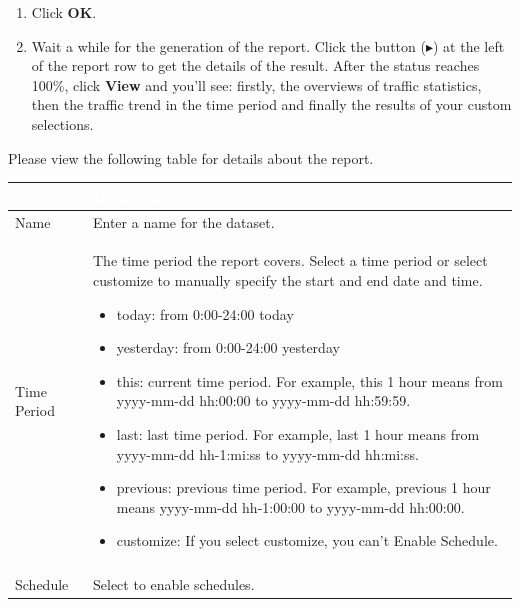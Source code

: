 \begin{description}
\begin{enumerate}
        \item Click \textbf{OK}.
        \item Wait a while for the generation of the report. Click the button (\mbox{$\blacktriangleright$}) at the left of the report row to get the details of the result. 
        After the status reaches 100\%, click \textbf{View} and you’ll see: firstly, the overviews of traffic statistics, then the traffic trend in the time period and finally the results of your custom selections. 
    \end{enumerate}
    \item[] Please view the following table for details about the report.
    \begin{longtable}{p{}|p{}}   
        \rowcolor{black}\multicolumn{1}{l!\vlinewhite}{\textcolor{white}{Field}}  & \textcolor{white}{Description} \\\hline                                                                                                                                                          
        Name & Enter a name for the dataset.\\\hline  
        Time Period & The time period the report covers. Select a time period or select customize to manually specify the start and end date and time.
                        \begin{itemize}
                            \item today: from 0:00-24:00 today
                            \item yesterday: from 0:00-24:00 yesterday
                            \item this: current time period. For example, this 1 hour means from yyyy-mm-dd hh:00:00 to yyyy-mm-dd hh:59:59.
                            \item last: last time period. For example, last 1 hour means from yyyy-mm-dd hh-1:mi:ss to yyyy-mm-dd hh:mi:ss.
                            \item previous: previous time period. For example, previous 1 hour means yyyy-mm-dd hh-1:00:00 to yyyy-mm-dd hh:00:00.
                            \item customize: If you select customize, you can’t Enable Schedule.
                        \end{itemize} \\\hline 
        \tabincell{l}{Enable\\ Schedule} & Select to enable schedules.\\\hline 

\end{longtable}
\end{description}
